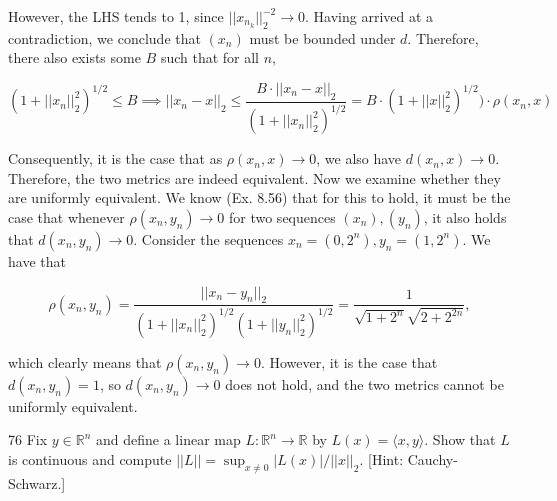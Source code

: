 \begin{solution}
    However, the LHS tends to 1, since $\lvert \lvert x_{n_k} \rvert \rvert_2^{-2} \rightarrow 0$.
    Having arrived at a contradiction, we conclude that $(x_n)$ must be bounded under $d$.
    Therefore, there also exists some $B$ such that for all $n,$

    \[ (1 + \lvert \lvert x_n \rvert \rvert_2^2)^{1/2} \leq B \implies \lvert \lvert x_n - x \rvert \rvert_2 \leq \frac{B\cdot \lvert \lvert x_n - x \rvert \rvert_2}{(1 + \lvert \lvert x_n \rvert \rvert_2^2)^{1/2}} = B \cdot (1 + \lvert \lvert x \rvert \rvert_2^2)^{1/2}) \cdot \rho(x_n, x)\]

    Consequently, it is the case that as $\rho(x_n, x) \rightarrow 0$, we also have $d(x_n, x) \rightarrow 0$.
    Therefore, the two metrics are indeed equivalent.
    Now we examine whether they are uniformly equivalent.
    We know (Ex. 8.56) that for this to hold, it must be the case that whenever $\rho(x_n, y_n) \rightarrow 0$ for two sequences $(x_n), (y_n)$, it also holds that $d(x_n, y_n) \rightarrow 0$.
    Consider the sequences $x_n = (0, 2^n), y_n = (1, 2^n)$.
    We have that

    \[\rho(x_n, y_n) = \frac{\lvert \lvert x_n - y_n \rvert \rvert_2}{(1 + \lvert \lvert x_n \rvert \rvert_2^2)^{1/2}(1 + \lvert \lvert y_n \rvert \rvert_2^2)^{1/2}} = \frac{1}{\sqrt{1 + 2^n}\sqrt{2 + 2^{2n}}},\]

    which clearly means that $\rho(x_n, y_n) \rightarrow 0$.
    However, it is the case that $d(x_n, y_n) = 1$, so $d(x_n, y_n) \rightarrow 0$ does not hold, and the two metrics cannot be uniformly equivalent.
    
\end{solution}

\begin{exercise}{76}
    Fix $y \in \mathbb{R}^n$ and define a linear map $L: \mathbb{R}^n \rightarrow \mathbb{R}$ by $L(x) = \langle x, y \rangle$.
    Show that $L$ is continuous and compute $\lvert \lvert L \rvert \rvert = \sup_{x \neq 0} \lvert L(x) \rvert / \lvert \lvert x \rvert \rvert_2$.
    [Hint: Cauchy-Schwarz.]
\end{exercise}

